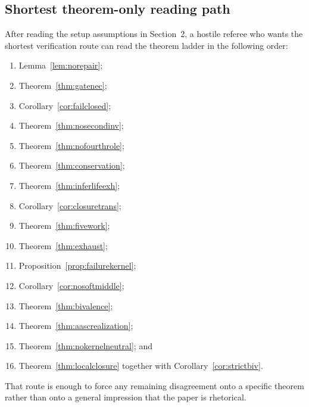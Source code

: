 \documentclass[11pt]{article}
\begin{document}
\subsection*{Shortest theorem-only reading path}
After reading the setup assumptions in Section~2, a hostile referee who wants the shortest verification route can read the theorem ladder in the following order:
\begin{enumerate}
\item Lemma~\ref{lem:norepair};
\item Theorem~\ref{thm:gatenec};
\item Corollary~\ref{cor:failclosed};
\item Theorem~\ref{thm:nosecondinv};
\item Theorem~\ref{thm:nofourthrole};
\item Theorem~\ref{thm:conservation};
\item Theorem~\ref{thm:inferlifeexh};
\item Corollary~\ref{cor:closuretrans};
\item Theorem~\ref{thm:fivework};
\item Theorem~\ref{thm:exhaust};
\item Proposition~\ref{prop:failurekernel};
\item Corollary~\ref{cor:nosoftmiddle};
\item Theorem~\ref{thm:bivalence};
\item Theorem~\ref{thm:aascrealization};
\item Theorem~\ref{thm:nokernelneutral}; and
\item Theorem~\ref{thm:localclosure} together with Corollary~\ref{cor:strictbiv}.
\end{enumerate}

That route is enough to force any remaining disagreement onto a specific theorem rather than onto a general impression that the paper is rhetorical.
\end{document}
